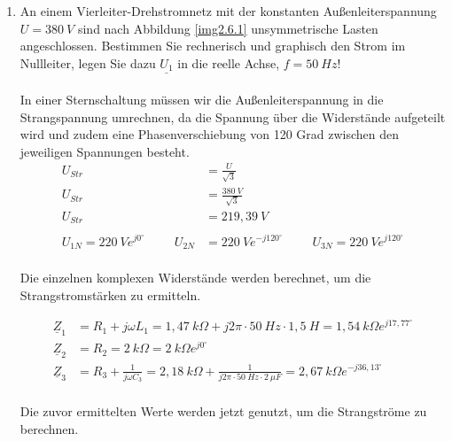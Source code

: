 \begin{enumerate}[label=\alph*)]
  \item\label{aufgabe2.5} An einem Vierleiter-Drehstromnetz mit der konstanten Außenleiterspannung $U = 380\ V$ sind nach Abbildung \ref{img2.6.1} unsymmetrische Lasten angeschlossen. Bestimmen Sie rechnerisch und graphisch den Strom im Nullleiter, legen Sie dazu $\underline{U_1}$ in die reelle Achse, $f = 50\ Hz$!
	\\ \ \\
	In einer Sternschaltung müssen wir die Außenleiterspannung in die Strangspannung umrechnen, da die Spannung über die Widerstände aufgeteilt wird und zudem eine Phasenverschiebung von 120 Grad zwischen den jeweiligen Spannungen besteht.\\
	\begin{align*}
		U_{Str} &= \frac{U}{\sqrt{3}} \\
		U_{Str} &= \frac{380\ V}{\sqrt{3}}\\
		U_{Str} &= 219,39\ V\\ \ \\
		U_{1N}=220\ Ve^{j0^\circ} \hspace{1cm}
		U_{2N}&=220\ Ve^{-j120^\circ} \hspace{1cm}
		U_{3N}=220\ Ve^{j120^\circ}\\
	\end{align*}
		
	Die einzelnen komplexen Widerstände werden berechnet, um die Strangstromstärken zu ermitteln.
	
	\begin{align*}
		\underline{Z}_{1} &= R_{1} + j\omega L_{1} = 1,47\ k\Omega + j2\pi\cdot 50\ Hz\cdot1,5\ H = 1,54\ k\Omega e^{j17,77^\circ}\\
		\underline{Z}_{2} &= R_{2} = 2\ k\Omega = 2\ k\Omega e^{j0^\circ}\\
		\underline{Z}_{3} &= R_{3} + \frac{1}{j\omega C_{3}} = 2,18\ k\Omega + \frac{1}{j2\pi\cdot 50\ Hz\cdot2\ \mu F} = 2,67\ k\Omega e^{-j36,13^\circ}\\
	\end{align*}
	
	Die zuvor ermittelten Werte werden jetzt genutzt, um die Strangströme zu berechnen.
	

\end{enumerate}

